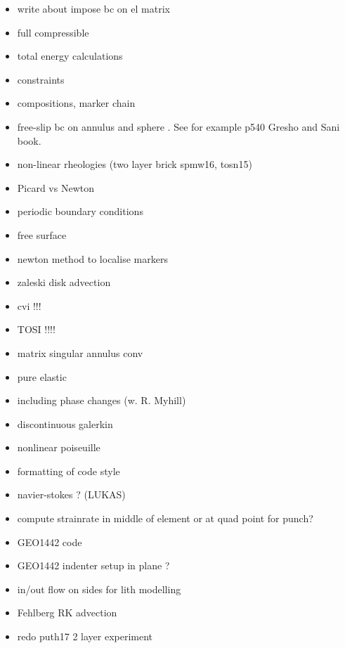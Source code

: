 \documentclass[a4paper]{article}
\begin{document}
\begin{itemize}
\item
write about impose bc on el matrix

\item
full compressible 

\item
total energy calculations

\item
constraints

\item
compositions, marker chain

\item
free-slip bc on annulus and sphere . See for example p540 Gresho and Sani book.

\item
non-linear rheologies (two layer brick spmw16, tosn15) 

\item
Picard vs Newton

\item
periodic boundary conditions

\item
free surface 

\item 
newton method to localise markers

\item
zaleski disk advection

\item
cvi !!!

\item TOSI !!!!

\item matrix singular annulus conv

\item
pure elastic 

\item
including phase changes (w. R. Myhill)

\item
discontinuous galerkin

\item
nonlinear poiseuille

\item
formatting of code style

\item
navier-stokes ? (LUKAS)

\item
compute strainrate in middle of element or at quad point for punch?

\item
GEO1442 code 

\item
GEO1442 indenter setup in plane ?

\item
in/out flow on sides for lith modelling

\item
Fehlberg RK advection

\item redo puth17 2 layer experiment

\end{itemize}
\end{document}

